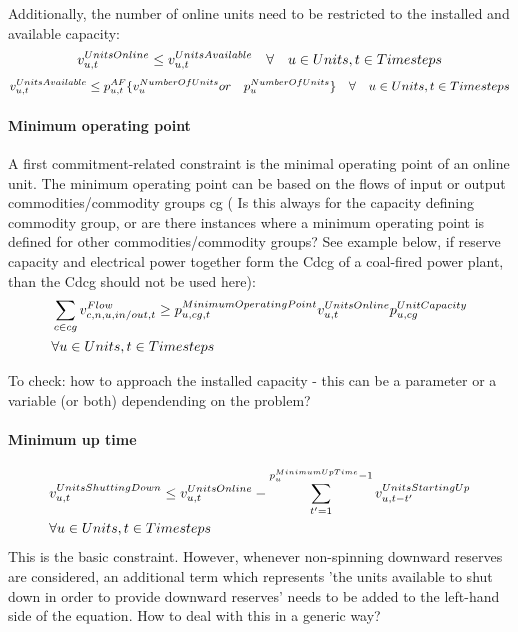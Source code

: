 Additionally, the number of online units need to be restricted to the installed and available capacity:
\begin{equation} \label{eq:maximumonlineunits}
\vUnitsOnline \le \vUnitsAvailable \quad \forall \quad \units, \timesteps
\end{equation}
\begin{equation} \label{eq:availableunits}
\vUnitsAvailable \le \pAF \{\vNumberOfUnits or \quad \pNumberOfUnits\} \quad \forall \quad \units, \timesteps
\end{equation}

\paragraph{Minimum operating point}
A first commitment-related constraint is the minimal operating point of an online unit. The minimum operating point can be based on the flows of input or output commodities/commodity groups cg ({\color{red}
Is this always for the capacity defining commodity group, or are there instances where a minimum operating point is defined for other commodities/commodity groups?} See example below, if reserve capacity and electrical power together form the Cdcg of a coal-fired power plant, than the Cdcg should not be used here):
\begin{align} \label{eq:minimumoperatingpoint}
&\sum_{\commodity \in cg} \vFlow \ge \pMinimumOperatingPoint \vUnitsOnline \pUnitCapacity \nonumber \\
& \forall \units, \timesteps
\end{align}

{\color{red} To check: how to approach the installed capacity - this can be a parameter or a variable (or both) dependending on the problem?}


\paragraph{Minimum up time}
\begin{align} \label{eq:minimumuptime}
&\vUnitsShuttingDown \le \vUnitsOnline - \sum_{\timestep'=1}^{\pMinimumUpTime - 1} \vUnitsStartingUp[\unit,\timestep-\timestep'] \nonumber \\
& \forall \units, \timesteps
\end{align}
{\color{red} This is the basic constraint. However, whenever non-spinning downward reserves are considered, an additional term which represents 'the units available to shut down in order to provide downward reserves' needs to be added to the left-hand side of the equation. How to deal with this in a generic way?}

